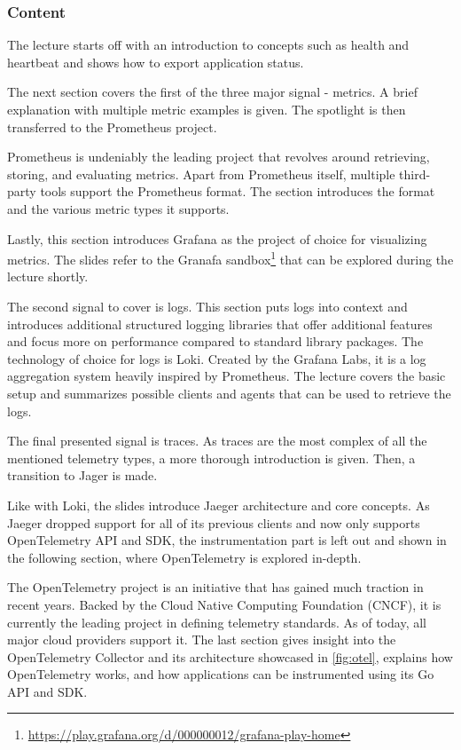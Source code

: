 \documentclass[
  digital,
  color,
  oneside,
  nosansbold,
  nocolorbold,
  nolof,
  nolot,
]{fithesis4}
\begin{document}
\subsubsection{Content}

The lecture starts off with an introduction to concepts such as health and heartbeat and shows how to export application status.

The next section covers the first of the three major signal - metrics. A brief explanation with multiple metric examples is given. The spotlight is then transferred to the Prometheus project.

Prometheus\cite{prometheus} is undeniably the leading project that revolves around retrieving, storing, and evaluating metrics. Apart from Prometheus itself, multiple third-party tools support the Prometheus format. The section introduces the format and the various metric types it supports.

Lastly, this section introduces Grafana\cite{grafana} as the project of choice for visualizing metrics. The slides refer to the Granafa sandbox\footnote{ \url{https://play.grafana.org/d/000000012/grafana-play-home}}
that can be explored during the lecture shortly.

The second signal to cover is logs. This section puts logs into context and introduces additional structured logging libraries that offer additional features and focus more on performance compared to standard library packages.
The technology of choice for logs is Loki\cite{loki}. Created by the Grafana Labs, it is a log aggregation system heavily inspired by Prometheus. The lecture covers the basic setup and summarizes possible clients and agents that can be used to retrieve the logs.

The final presented signal is traces. As traces are the most complex of all the mentioned telemetry types, a more thorough introduction is given. Then, a transition to Jager\cite{jaeger} is made.

Like with Loki, the slides introduce Jaeger architecture and core concepts. As Jaeger dropped support for all of its previous clients and now only supports OpenTelemetry API and SDK, the instrumentation part is left out and shown in the following section, where OpenTelemetry is explored in-depth.

The OpenTelemetry\cite{open-telemetry}
project is an initiative that has gained much traction in recent years. Backed by the Cloud Native Computing Foundation (CNCF)\cite{cncf},
it is currently the leading project in defining telemetry standards. As of today, all major cloud providers support it. The last section gives insight into the OpenTelemetry Collector and its architecture showcased in \cref{fig:otel}, explains how OpenTelemetry works, and how applications can be instrumented using its Go API and SDK.
\end{document}
